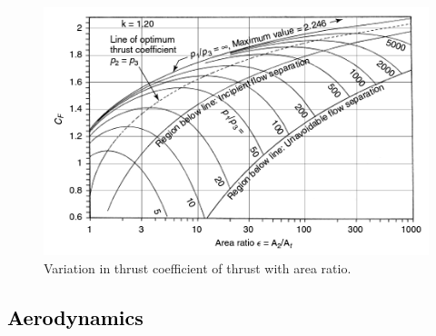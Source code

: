 		
		
		\begin{figure}[ht]
			\centering
			\includegraphics[width=0.7\linewidth]{"figures/3_vehicle_design/Thrust Coefficient - Arat"}
			\caption{Variation in thrust coefficient of thrust with area ratio\cite{RPE}.}
			\label{fig:ThrustCoefficient-Arat}
		\end{figure}

\textcolor{black}{
		\subsection{Aerodynamics}\label{sec:thirdstageaero}
	}
	
